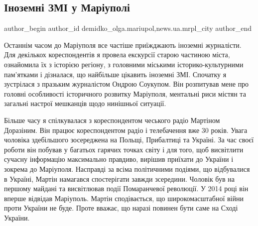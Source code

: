  
 
 
 
 
 
\subsection{Іноземні ЗМІ у Маріуполі}
\label{sec:16_02_2022.stz.news.ua.mrpl_city.1.inozemni_zmi_u_mariupoli}
 
\ifcmt
 author_begin
   author_id demidko_olga.mariupol,news.ua.mrpl_city
 author_end
\fi


Останнім часом до Маріуполя все частіше приїжджають іноземні журналісти. Для
декількох кореспондентів я провела екскурсії старою частиною міста, ознайомила
їх з історією регіону, з головними міськими історико-культурними пам'ятками і
дізналася, що найбільше цікавить іноземні ЗМІ. Спочатку я зустрілася з празьким
журналістом Ондрою Соукупом. Він розпитував мене про головні особливості
історичного розвитку Маріуполя, ментальні риси містян та загальні настрої
мешканців щодо нинішньої ситуації.

Більше часу я спілкувалася з кореспондентом чеського радіо Мартіном Доразіним.
Він працює кореспондентом радіо і телебачення вже 30 років. Увага чоловіка
здебільшого зосереджена на Польщі, Прибалтиці та Україні. За час своєї роботи
він побував у багатьох гарячих точках світу і для того, щоб висвітлити сучасну
інформацію максимально правдиво, вирішив приїхати до України і зокрема до
Маріуполя. Насправді за всіма політичними подіями, що відбувалися в Україні,
Мартін намагався спостерігати завжди зсередини. Чоловік був на першому майдані
та висвітлював події Помаранчевої революції. У 2014 році він вперше відвідав
Маріуполь. Мартін сподівається, що широкомасштабної війни проти України не
буде. Проте вважає, що наразі повинен бути саме на Сході України.



